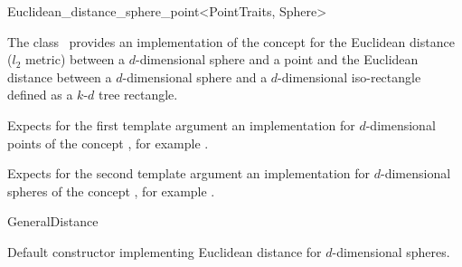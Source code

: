 

\begin{ccRefClass}{Euclidean_distance_sphere_point<PointTraits, Sphere>}  %


\ccDefinition
  
The class \ccRefName\ provides an implementation of 
the  concept
for the Euclidean distance ($l_2$ metric) between a $d$-dimensional sphere and a point and 
the Euclidean distance between a $d$-dimensional sphere
and a $d$-dimensional iso-rectangle defined as a $k$-$d$ tree rectangle.



\ccParameters
Expects for the first template argument
an implementation for
$d$-dimensional points of
the concept , 
for example .

Expects for the second template argument an implementation 
for $d$-dimensional spheres of the concept ,
for example .


\ccIsModel

GeneralDistance

\ccTypes


\ccCreation
{}  %


{Default constructor implementing Euclidean distance for
$d$-dimensional spheres.}

\ccOperations



\end{ccRefClass}
